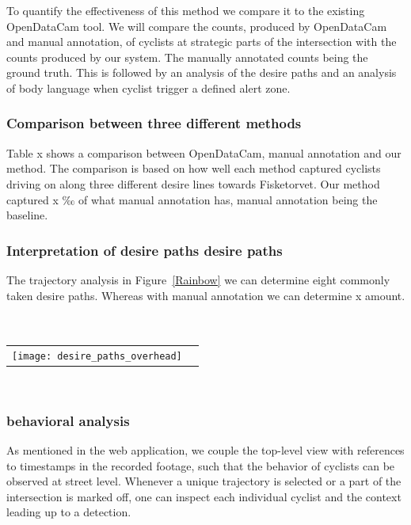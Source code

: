 To quantify the effectiveness of this method we compare it to the existing OpenDataCam tool.
We will compare the counts, produced by OpenDataCam and manual annotation, of cyclists at strategic parts of the intersection with the counts produced by our system. The manually annotated counts being the ground truth.
This is followed by an analysis of the desire paths and an analysis of body language when cyclist trigger a defined
alert zone.
\ \\ 

\subsubsection{Comparison between three different methods}
Table x shows a comparison between OpenDataCam, manual annotation and our method.
The comparison is based on how well each method captured cyclists driving on along three different 
desire lines towards Fisketorvet.
Our method captured x ‰ of what manual annotation has, manual annotation being the baseline.
\ \\

\subsubsection{Interpretation of desire paths desire paths}
The trajectory analysis in Figure~\ref{Rainbow} we can determine eight commonly taken desire paths. 
Whereas with manual annotation we can determine x amount.
\ \\
\raggedbottom
\ \\ 
\noindent
\begin{tabular}{@{}cc}
\texttt{[image: desire\_paths\_overhead]} 
\end{tabular}
\label{traject}

\ \\
\subsubsection{behavioral analysis}
As mentioned in the web application, we couple the top-level view with references to timestamps in the recorded footage, 
such that the behavior of cyclists can be observed at street level.
Whenever a unique trajectory is selected or a part of the intersection is marked off, one can inspect each individual cyclist 
and the context leading up to a detection.
\\

